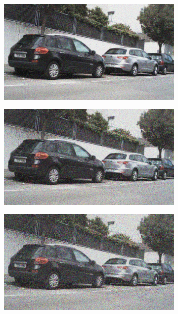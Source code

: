 \documentclass[a4paper]{ctexart}
\begin{document}
\begin{figure}[htbp]
\begin{subfigure}{0.08\textwidth}
				\label{fig：Gamma=0.7, Gauss Noise = 0.1}
			\end{subfigure}
			\begin{subfigure}{0.08\textwidth}
				\captionsetup{font=scriptsize}
				\includegraphics[width=\linewidth]{picture/Edge Detection/degrade/RGB_001 Gamma=0.7, Gauss Noise=0.2}
				\label{fig：Gamma=0.7, Gauss Noise = 0.2}
			\end{subfigure}
			\begin{subfigure}{0.08\textwidth}
				\captionsetup{font=scriptsize}
				\includegraphics[width=\linewidth]{picture/Edge Detection/degrade/RGB_001 Gamma=0.7, Gauss Noise=0.3}
				\label{fig：Gamma=0.7, Gauss Noise = 0.3}
			\end{subfigure}
			\begin{subfigure}{0.08\textwidth}
				\captionsetup{font=scriptsize}
				\includegraphics[width=\linewidth]{picture/Edge Detection/degrade/RGB_001 Gamma=0.7, Gauss Noise=0.4}

\end{subfigure}
\end{figure}
\end{document}
